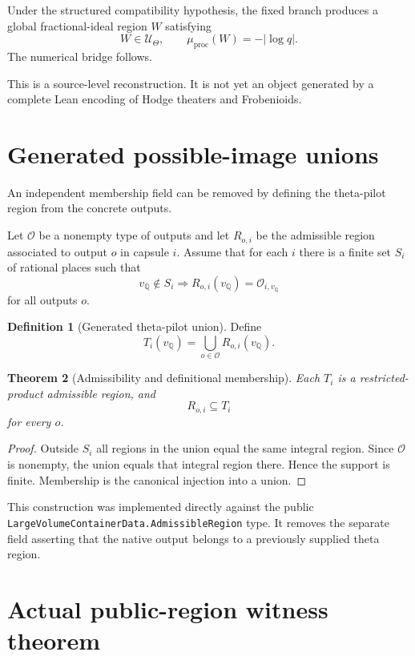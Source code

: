 \documentclass[11pt]{amsart}
\newtheorem{theorem}{Theorem}[section]
\theoremstyle{definition}
\newtheorem{definition}[theorem]{Definition}
\theoremstyle{remark}
\newcommand{\Q}{\mathbb Q}
\newcommand{\OO}{\mathcal O}
\newcommand{\UTheta}{\mathcal U_\Theta}
\newcommand{\mup}{\mu_{\mathrm{proc}}}
\begin{document}
Under the structured compatibility hypothesis, the fixed branch produces a
global fractional-ideal region $W$ satisfying
\[
 W\in\UTheta,
 \qquad
 \mup(W)=-|\log q|.
\]
The numerical bridge follows.

This is a source-level reconstruction.  It is not yet an object generated by a
complete Lean encoding of Hodge theaters and Frobenioids.

\section{Generated possible-image unions}

An independent membership field can be removed by defining the theta-pilot
region from the concrete outputs.

Let $\mathscr O$ be a nonempty type of outputs and let $R_{o,i}$ be the
admissible region associated to output $o$ in capsule $i$.  Assume that for
each $i$ there is a finite set $S_i$ of rational places such that
\[
 v_{\Q}\notin S_i
 \Longrightarrow
 R_{o,i}(v_{\Q})=\OO_{i,v_{\Q}}
\]
for all outputs $o$.

\begin{definition}[Generated theta-pilot union]
Define
\[
 T_i(v_{\Q})=\bigcup_{o\in\mathscr O}R_{o,i}(v_{\Q}).
\]
\end{definition}

\begin{theorem}[Admissibility and definitional membership]\label{thm:union}
Each $T_i$ is a restricted-product admissible region, and
\[
 R_{o,i}\subseteq T_i
\]
for every $o$.
\end{theorem}

\begin{proof}
Outside $S_i$ all regions in the union equal the same integral region.  Since
$\mathscr O$ is nonempty, the union equals that integral region there.  Hence
the support is finite.  Membership is the canonical injection into a union.
\end{proof}

This construction was implemented directly against the public
\texttt{LargeVolumeContainerData.AdmissibleRegion} type.  It removes the
separate field asserting that the native output belongs to a previously
supplied theta region.

\section{Actual public-region witness theorem}
\end{document}
